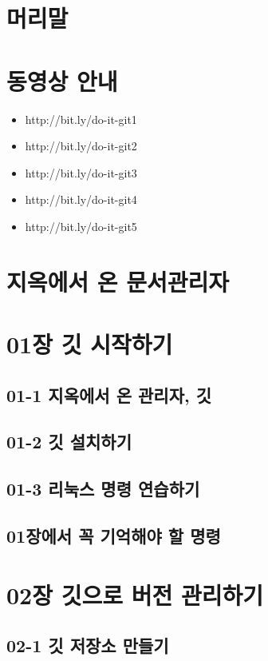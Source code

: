 \documentclass[12pt, a4paper, oneside]{book}
\let\stdsection\section
\renewcommand\section{\newpage\stdsection}
\begin{document}
		\section 	{머리말}
		\section 	{동영상 안내}

		\begin{itemize}
			\item 	http://bit.ly/do-it-git1
			\item 	http://bit.ly/do-it-git2
			\item 	http://bit.ly/do-it-git3
			\item 	http://bit.ly/do-it-git4
			\item 	http://bit.ly/do-it-git5
		\end{itemize}



	 	\section{	지옥에서 온 문서관리자	}		
						
		\section{	01장 깃 시작하기	}		
		\subsection{	01-1 지옥에서 온 관리자, 깃	}		
		\subsection{	01-2 깃 설치하기	}		
		\subsection{	01-3 리눅스 명령 연습하기	}		
		\subsection{	01장에서 꼭 기억해야 할 명령	}		
						
		\section{	02장 깃으로 버전 관리하기	}		
		\subsection{	02-1 깃 저장소 만들기	}		
\end{document}
